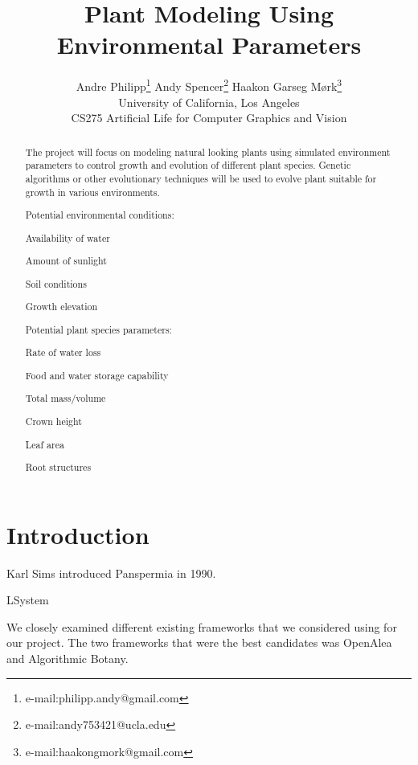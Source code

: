 \documentclass[conference]{acmsiggraph}
\title{Plant Modeling Using Environmental Parameters}
\author{
  Andre Philipp\thanks{e-mail:philipp.andy@gmail.com}
  \qquad
  Andy Spencer\thanks{e-mail:andy753421@ucla.edu}
  \qquad
  Haakon Garseg Mørk\thanks{e-mail:haakongmork@gmail.com}
  \\
  University of California, Los Angeles \\
  CS275 Artificial Life for Computer Graphics and Vision
}
\begin{document}

\maketitle

\begin{abstract}

The project will focus on modeling natural looking plants using simulated
environment parameters to control growth and evolution of different plant
species. Genetic algorithms or other evolutionary techniques will be used to
evolve plant suitable for growth in various environments.

Potential environmental conditions:

\begin{itemize*}
  \item Availability of water
  \item Amount of sunlight
  \item Soil conditions
  \item Growth elevation
\end{itemize*}

Potential plant species parameters:

\begin{itemize*}
  \item Rate of water loss
  \item Food and water storage capability
  \item Total mass/volume
  \item Crown height
  \item Leaf area
  \item Root structures
\end{itemize*}

\end{abstract}

\keywordlist


\section{Introduction}

Karl Sims introduced Panspermia in 1990.

LSystem

We closely examined different existing frameworks that we considered using for
our project. The two frameworks that were the best candidates was
OpenAlea\cite{openalea} and Algorithmic Botany\cite{abotany}.
\end{document}
